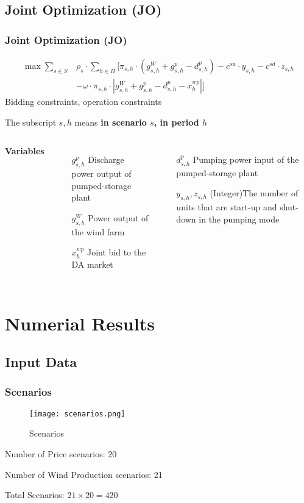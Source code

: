 \subsection{Joint Optimization (JO)}
\begin{frame}
  \frametitle{Joint Optimization (JO)}
\begin{tcolorbox}[colback=white!5,colframe=white!40!black,title= Model of Pumped-Storage Plant]
  \begin{equation}
    \begin{split}
    \max
      \sum_{s\in S} & \rho_s  \cdot  \sum_{h\in H}[\pi_{s,h}\cdot (g_{s,h}^W + g_{s,h}^p-d_{s,h}^p) -c^{su}\cdot y_{s,h} -c^{sd}\cdot z_{s,h} \\
     & -  \omega\cdot\pi_{s,h}\cdot|g_{s,h}^W+g_{s,h}^p -d_{s,h}^p- x_{h}^{wp}|] \nonumber
   \end{split}
  \end{equation}
Bidding constraints, operation constraints
\end{tcolorbox}
The subscript $s,h$ means \textbf{in scenario $s$, in period $h$}
\begin{columns}
\textbf{Variables}
\begin{itemize}
\item[$g_{s,h}^p$] Discharge power output of pumped-storage plant
\item[$g_{s,h}^W$] Power output of the wind farm
\item[$x_{h}^{wp}$] Joint bid to the DA market
\end{itemize}
\begin{itemize}
\item[$d_{s,h}^p$] Pumping power input of the pumped-storage plant
\item[$y_{s,h},z_{s,h}$] (Integer)The number of units that are start-up and shut-down in the pumping mode
\end{itemize}
\end{columns}
\end{frame}


\section{Numerial Results}
\subsection{Input Data}
\begin{frame}
  \frametitle{Scenarios}

\begin{figure}[htbp]
  \centering
  \texttt{[image: scenarios.png]}
  \caption{Scenarios}
  \label{fig:scenarios}
\end{figure}
Number of Price scenarios: 20

Number of Wind Production scenarios: 21

Total Scenarios: $21\times 20 = 420$
\end{frame}

